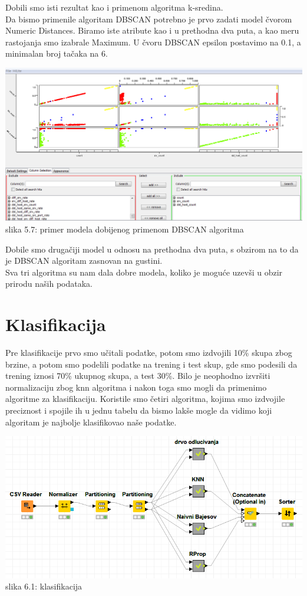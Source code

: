 \documentclass[10pt]{article}
\begin{document}
Dobili smo isti rezultat kao i primenom algoritma k-sredina.\\
Da bismo primenile algoritam DBSCAN potrebno je prvo zadati model \v cvorom Numeric Distances. Biramo iste atribute kao i u prethodna dva puta, a kao meru rastojanja smo izabrale Maximum. U \v cvoru DBSCAN epsilon postavimo na 0.1, a minimalan broj ta\v caka na 6.

\begin{center}
\includegraphics[width = \textwidth]{Klaster7}
slika 5.7: primer modela dobijenog primenom DBSCAN algoritma\\
\end{center}

Dobile smo druga\v ciji model u odnosu na prethodna dva puta, s obzirom na to da je DBSCAN algoritam zasnovan na gustini.\\
Sva tri algoritma su nam dala dobre modela, koliko je mogu\' ce uzev\v si u obzir prirodu na\v sih podataka.

\section{Klasifikacija}

Pre klasifikacije prvo smo u\v citali podatke, potom smo izdvojili 10\% skupa zbog brzine, a potom smo podelili podatke na trening i test skup, gde smo podesili da trening iznosi 70\% ukupnog skupa, a test 30\%. Bilo je neophodno izvr\v siti normalizaciju zbog knn algoritma i nakon toga smo mogli da primenimo algoritme za klasifikaciju. Koristile smo \v cetiri algoritma, kojima smo izdvojile preciznost i spojile ih u jednu tabelu da bismo lak\v se mogle da vidimo koji algoritam je najbolje klasifikovao na\v se podatke.

\begin{center}
\includegraphics[width = \textwidth,height = 3.5 cm]{Klas1}
slika 6.1: klasifikacija\\
\end{center}
\end{document}
